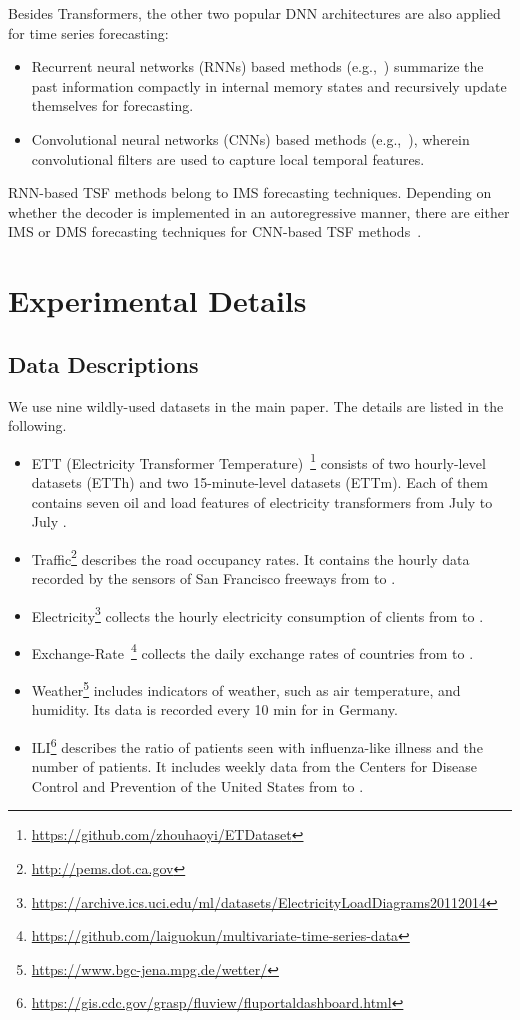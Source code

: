 \documentclass[10pt,twocolumn,letterpaper]{article}
\begin{document}
Besides Transformers, the other two popular DNN architectures are also applied for time series forecasting: 

\begin{itemize}
    \item Recurrent neural networks (RNNs) based methods (e.g.,~\cite{petnehazi2019recurrent}) summarize the past information compactly in internal memory states and recursively update themselves for forecasting. 
    \item Convolutional neural networks (CNNs) based methods (e.g.,~\cite{bai2018empirical}), wherein convolutional filters are used to capture local temporal features.
\end{itemize}

RNN-based TSF methods belong to IMS forecasting techniques. Depending on whether the decoder is implemented in an autoregressive manner, there are either IMS or DMS forecasting techniques for CNN-based TSF methods~\cite{bai2018empirical,liu2021time}. 

\section{Experimental Details}
\label{sec:supp_exp}
\subsection{Data Descriptions}
We use nine wildly-used datasets in the main paper. The details are listed in the following.
\begin{itemize}
\item ETT (Electricity Transformer Temperature)~\cite{informer}\footnote{\url{https://github.com/zhouhaoyi/ETDataset}} consists of two hourly-level datasets (ETTh) and two 15-minute-level datasets (ETTm). Each of them contains seven oil and load features of electricity transformers from July  to July .
\item Traffic\footnote{\url{http://pems.dot.ca.gov}} describes the road occupancy rates. It contains the hourly data recorded by the sensors of San Francisco freeways from  to . 
\item Electricity\footnote{\url{https://archive.ics.uci.edu/ml/datasets/ElectricityLoadDiagrams20112014}} collects the hourly electricity consumption of  clients from  to .
\item Exchange-Rate~\cite{GuokunLai2017lstm}\footnote{\url{https://github.com/laiguokun/multivariate-time-series-data}} collects the daily exchange rates of  countries from  to .
\item Weather\footnote{\url{https://www.bgc-jena.mpg.de/wetter/}} includes  indicators of weather, such as air temperature, and humidity. Its data is recorded every 10 min for  in Germany.
\item ILI\footnote{\url{https://gis.cdc.gov/grasp/fluview/fluportaldashboard.html}} describes the ratio of patients seen with influenza-like illness and the number of patients. It includes weekly data from the Centers for Disease Control and Prevention of the United States from  to .

\end{itemize}
\end{document}

